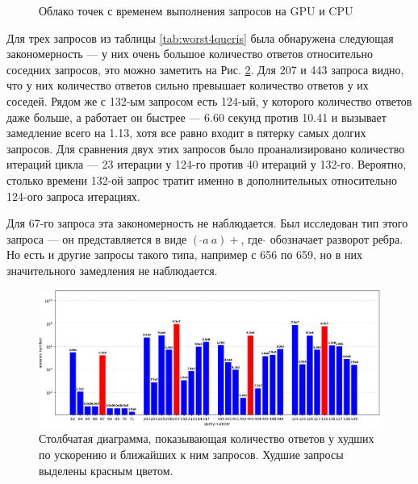 \begin{figure}[H]
    \centering
    
    \caption{Облако точек с временем выполнения запросов на GPU и CPU}
    \label{fig:WikidataGraph}
\end{figure}

Для трех запросов из таблицы \ref{tab:worst4queris} была обнаружена следующая закономерность --- у них очень большое количество ответов относительно соседних запросов, это можно заметить на Рис. \ref{fig:WikidataBadQueries}. Для 207 и 443 запроса видно, что у них количество ответов сильно превышает количество ответов у их соседей. Рядом же с 132-ым запросом есть 124-ый, у которого количество ответов даже больше, а работает он быстрее --- 6.60 секунд против 10.41 и вызывает замедление всего на 1.13, хотя все равно входит в пятерку самых долгих запросов. Для сравнения двух этих запросов было проанализировано количество итераций цикла --- 23 итерации у 124-го против 40 итераций у 132-го. Вероятно, столько времени 132-ой запрос тратит именно в дополнительных относительно 124-ого запроса итерациях.  

Для 67-го запроса эта закономерность не наблюдается. Был исследован тип этого запроса --- он представляется в виде $(~\hat{}a~a)+$, где $\hat{}$ обозначает разворот ребра. Но есть и другие запросы такого типа, например с 656 по 659, но в них значительного замедления не наблюдается.

\begin{figure}[H]
    \centering
    \includegraphics[width=\textwidth]{figures/answers_scaled.png}
    \caption{Столбчатая диаграмма, показывающая количество ответов у худших по ускорению  и ближайших к ним запросов. Худшие запросы выделены красным цветом.}
    \label{fig:WikidataBadQueries}
\end{figure}

